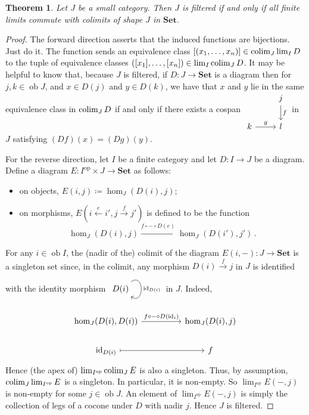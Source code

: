 \documentclass[a4paper,11pt]{article}
\theoremstyle{break_italics}
\newtheorem*{theorem*}{Theorem}
\theoremstyle{break_upright}
\theoremstyle{remark}
\newcommand{\id}{\mathrm{id}}
\newcommand{\ob}{\operatorname{ob}}
\newcommand{\Set}{\mathbf{Set}}
\newcommand{\op}{\mathrm{op}}
\def\colim{\qopname\relax m{colim}}
\begin{document}
\begin{theorem*}
	Let $J$ be a small category. Then $J$ is filtered if and only if all finite limits commute with colimits of shape $J$ in $\Set$.
\end{theorem*}
\begin{proof}
	The forward direction asserts that the induced functions are bijections. Just do it. The function sends an equivalence class $[(x_1,\dots,x_n)] \in \colim_J \lim_I D$ to the tuple of equivalence classes $([x_1], \dots, [x_n]) \in \lim_I \colim_J D$. It may be helpful to know that, because $J$ is filtered, if $D \colon J \to \Set$ is a diagram then for $j,k\in\ob J$, and $x \in D(j)$ and $y \in D(k)$, we have that $x$ and $y$ lie in the same equivalence class in $\colim_J D$ if and only if there exists a cospan $\begin{tikzcd}
	& j \\
	k & l
	\arrow["f", from=1-2, to=2-2]
	\arrow["g", from=2-1, to=2-2]
\end{tikzcd}$ in $J$ satisfying $(Df)(x) = (Dg)(y)$.
	
	For the reverse direction, let $I$ be a finite category and let $D \colon I \to J$ be a diagram. Define a diagram $E \colon I^\op \times J \to \Set$ as follows:
	\begin{itemize}
		\item on objects, $E(i,j) \coloneqq \hom_J(D(i), j)$;
		\item on morphisms, $E(i \xleftarrow{e} i', j \xrightarrow{f} j')$ is defined to be the function
			\[
				\hom_J(D(i), j) \xrightarrow{f \circ - \circ D(e)} \hom_J(D(i'), j')\,.
			\]
	\end{itemize}
	For any $i \in \ob I$, the (nadir of the) colimit of the diagram $E(i,-) \colon J \to \Set$ is a singleton set since, in the colimit, any morphism $D(i) \xrightarrow{f} j$ in $J$ is identified with the identity morphism $\begin{tikzcd}
D(i) \arrow["\id_{D(i)}", loop, distance=2em, in=325, out=35]
\end{tikzcd}$ in $J$. Indeed,
\[
\begin{tikzcd}
{\hom_J(D(i),D(i))} \arrow[rr, "f \circ - \circ D(\id_i)"] &  & {\hom_J(D(i),j)} \\
\id_{D(i)} \arrow[rr, maps to]                             &  & f               
\end{tikzcd}
\]
Hence (the apex of) $\lim_{I^{\op}} \colim_J E$ is also a singleton. Thus, by assumption, $\colim_J \lim_{I^\op} E$ is a singleton. In particular, it is non-empty. So $\lim_{I^\op} E(-, j)$ is non-empty for some $j \in \ob J$. An element of $\lim_{I^\op} E(-,j)$ is simply the collection of legs of a cocone under $D$ with nadir $j$. Hence $J$ is filtered.
\end{proof}
\end{document}
